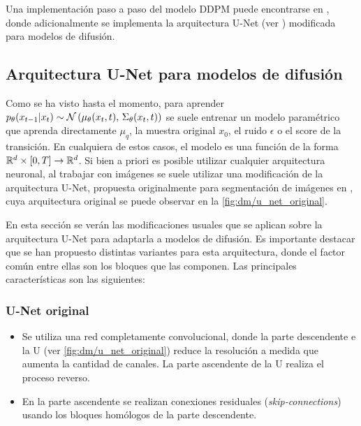 Una implementación paso a paso del modelo DDPM puede encontrarse en \cite{huggingface_annotated_diffusion_2022}, donde adicionalmente se implementa la arquitectura U-Net (ver \cite{ronneberger2015unet}) modificada para modelos de difusión.

\subsection{Arquitectura U-Net para modelos de difusión}
\label{dm/discrete_dm/unet}

Como se ha visto hasta el momento, para aprender $p_\theta(x_{t-1}|x_t)\sim\mathcal{N}\left(\mu_\theta(x_t,t),\,\Sigma_\theta(x_t,t)\right)$ se suele entrenar un modelo paramétrico que aprenda directamente $\mu_q$, la muestra original $x_0$, el ruido $\epsilon$ o el score de la transición. En cualquiera de estos casos, el modelo es una función de la forma $\mathbb{R}^d\times [0,T]\to\mathbb{R}^d$. Si bien a priori es posible utilizar cualquier arquitectura neuronal, al trabajar con imágenes se suele utilizar una modificación de la arquitectura U-Net, propuesta originalmente para segmentación de imágenes en \cite{ronneberger2015unet}, cuya arquitectura original se puede observar en la \autoref{fig:dm/u_net_original}.


En esta sección se verán las modificaciones usuales que se aplican sobre la arquitectura U-Net para adaptarla a modelos de difusión. Es importante destacar que se han propuesto distintas variantes para esta arquitectura, donde el factor común entre ellas son los bloques que las componen. Las principales características son las siguientes:

\subsubsection{U-Net original}

\begin{itemize}
	\item Se utiliza una red completamente convolucional, donde la parte descendente e la U (ver \autoref{fig:dm/u_net_original}) reduce la resolución a medida que aumenta la cantidad de canales. La parte ascendente de la U realiza el proceso reverso.
	\item En la parte ascendente se realizan conexiones residuales (\textit{skip-connections}) usando los bloques homólogos de la parte descendente.
\end{itemize}


